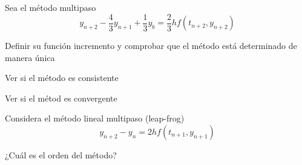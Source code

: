 \begin{problem}[5]
Sea el método multipaso
\[y_{n+2} - \frac{4}{3}y_{n+1}+\frac{1}{3}y_b = \frac{2}{3}hf(t_{n+2},y_{n+2})\]

\ppart Definir su función incremento y comprobar que el método está determinado de manera única

\ppart Ver si el método es consistente

\ppart Ver si el métod es convergente
\solution
\end{problem}

\begin{problem}[6]
Considera el método lineal multipaso (leap-frog)
\[y_{n+2}-y_n = 2hf(t_{n+1},y_{n+1})\]

¿Cuál es el orden del método?
\solution
\end{problem}
